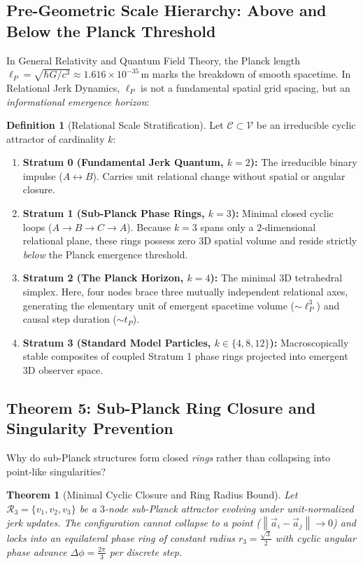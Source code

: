 \documentclass[11pt,a4paper]{article}
\theoremstyle{plain}
\newtheorem{theorem}{Theorem}[section]
\theoremstyle{definition}
\newtheorem{definition}{Definition}[section]
\theoremstyle{remark}
\newcommand{\Acc}{\vec{a}}
\newcommand{\norm}[1]{\left\lVert #1 \right\rVert}
\begin{document}
\subsection{Pre-Geometric Scale Hierarchy: Above and Below the Planck Threshold}
In General Relativity and Quantum Field Theory, the Planck length $\ell_P = \sqrt{\hbar G / c^3} \approx 1.616 \times 10^{-35}\,\text{m}$ marks the breakdown of smooth spacetime. In Relational Jerk Dynamics, $\ell_P$ is not a fundamental spatial grid spacing, but an \emph{informational emergence horizon}:
\begin{definition}[Relational Scale Stratification]
\label{def:scale_strata}
Let $\mathcal{C} \subset \mathcal{V}$ be an irreducible cyclic attractor of cardinality $k$:
\begin{enumerate}
    \item \textbf{Stratum 0 (Fundamental Jerk Quantum, $k=2$):} The irreducible binary impulse ($A \leftrightarrow B$). Carries unit relational change without spatial or angular closure.
    \item \textbf{Stratum 1 (Sub-Planck Phase Rings, $k=3$):} Minimal closed cyclic loops ($A \to B \to C \to A$). Because $k=3$ spans only a $2$-dimensional relational plane, these rings possess zero $3\text{D}$ spatial volume and reside strictly \emph{below} the Planck emergence threshold.
    \item \textbf{Stratum 2 (The Planck Horizon, $k=4$):} The minimal $3\text{D}$ tetrahedral simplex. Here, four nodes brace three mutually independent relational axes, generating the elementary unit of emergent spacetime volume ($\sim \ell_P^3$) and causal step duration ($\sim t_P$).
    \item \textbf{Stratum 3 (Standard Model Particles, $k \in \{4, 8, 12\}$):} Macroscopically stable composites of coupled Stratum 1 phase rings projected into emergent $3\text{D}$ observer space.
\end{enumerate}
\end{definition}

\subsection{Theorem 5: Sub-Planck Ring Closure and Singularity Prevention}
Why do sub-Planck structures form closed \emph{rings} rather than collapsing into point-like singularities?

\begin{theorem}[Minimal Cyclic Closure and Ring Radius Bound]
\label{thm:sub_planck_ring}
Let $\mathcal{R}_3 = \{v_1, v_2, v_3\}$ be a $3$-node sub-Planck attractor evolving under unit-normalized jerk updates. The configuration cannot collapse to a point ($\norm{\Acc_i - \Acc_j} \to 0$) and locks into an equilateral phase ring of constant radius $r_3 = \frac{\sqrt{3}}{2}$ with cyclic angular phase advance $\Delta \phi = \frac{2\pi}{3}$ per discrete step.
\end{theorem}
\end{document}

